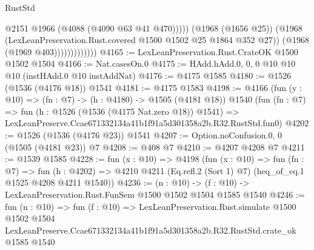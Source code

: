 \begin{lexlean}{RustStd}
\begin{coremodule}
                                @2151
                                @1966
                                (@4088 (@4090 @63 @41 @470)))))
                          (@1968 (@1656 @25))
                          (@1968 (LexLeanPreservation.Rust.covered @1500 @1502 @25 @1864 @352 @27))
                          (@1968 (@1969 @403)))))))))))))
@4165 := LexLeanPreservation.Rust.CrateOK @1500 @1502 @1504
@4166 := Nat.casesOn.{0}
@4175 := HAdd.hAdd.{0, 0, 0} @10 @10 @10 (instHAdd.{0} @10 instAddNat)
@4176 := @4175 @1585
@4180 := @1526 (@1536 (@4176 @18)) @1541
@4181 := @4175 @1583
@4198 := @4166
    (fun (y : @10) => (fn : @7) -> (h : @4180) -> @1505 (@4181 @18))
    @1540
    (fun (fn : @7) =>
    fun (h : @1526 (@1536 (@4175 Nat.zero @18)) @1541) =>
    LexLeanPreserve.Ccae671332134a41b1f91a5d301358a2b.R32.RustStd.fun0)
@4202 := @1526 (@1536 (@4176 @23)) @1541
@4207 := Option.noConfusion.{0, 0} (@1505 (@4181 @23)) @7
@4208 := @408 @7
@4210 := @4207 @4208 @7
@4211 := @1539 @1585
@4228 := fun (x : @10) =>
  @4198
    (fun (x : @10) =>
    fun (fn : @7) =>
    fun (h : @4202) =>
    @4210 @4211 (Eq.refl.{2} (Sort 1) @7) (heq_of_eq.{1} @1525 @4208 @4211 @1540))
@4236 := (n : @10) -> (f : @10) -> LexLeanPreservation.Rust.FunSem @1500 @1502 @1504 @1585 @1540
@4246 := fun (n : @10) =>
  fun (f : @10) =>
  LexLeanPreservation.Rust.simulate
    @1500
    @1502
    @1504
    LexLeanPreserve.Ccae671332134a41b1f91a5d301358a2b.R32.RustStd.crate_ok
    @1585
    @1540
\end{coremodule}
\end{lexlean}
